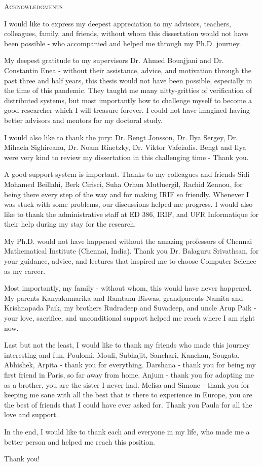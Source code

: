 \begin{center}
    \textsc{Acknowledgments}
  \end{center}
  \noindent

I would like to express my deepest appreciation to my advisors, teachers, colleagues, family, and friends, without whom this dissertation would not have been possible - who accompanied and helped me through my Ph.D. journey.

My deepest gratitude to my supervisors Dr. Ahmed Bouajjani and Dr. Constantin Enea - without their assistance, advice, and motivation through the past three and half years, this thesis would not have been possible, especially in the time of this pandemic. They taught me many nitty-gritties of verification of distributed systems, but most importantly how to challenge myself to become a good researcher which I will treasure forever. I could not have imagined having better advisors and mentors for my doctoral study.

I would also like to thank the jury: Dr. Bengt Jonsson, Dr. Ilya Sergey, Dr. Mihaela Sighireanu, Dr. Noam Rinetzky, Dr. Viktor Vafeiadis. Bengt and Ilya were very kind to review my dissertation in this challenging time - Thank you.

A good support system is important. Thanks to my colleagues and friends Sidi Mohamed Beillahi, Berk Cirisci, Suha Orhun Mutluergil, Rachid Zennou, for being there every step of the way and for making IRIF so friendly. Whenever I was stuck with some problems, our discussions helped me progress. I would also like to thank the administrative staff at ED 386, IRIF, and UFR Informatique for their help during my stay for the research.

My Ph.D. would not have happened without the amazing professors of Chennai Mathematical Institute (Chennai, India). Thank you Dr. Balaguru Srivathsan, for your guidance, advice, and lectures that inspired me to choose Computer Science as my career. 

Most importantly, my family - without whom, this would have never happened. My parents Kanyakumarika and Ramtanu Biswas, grandparents Namita and Krishnapada Paik, my brothers Rudradeep and Suvadeep, and uncle Arup Paik - your love, sacrifice, and unconditional support helped me reach where I am right now.

Last but not the least, I would like to thank my friends who made this journey interesting and fun. Poulomi, Mouli, Subhajit, Sanchari, Kanchan, Sougata, Abhishek, Arpita - thank you for everything. Darshana - thank you for being my first friend in Paris, so far away from home.  Anjum - thank you for adopting me as a brother, you are the sister I never had. Melisa and Simone - thank you for keeping me sane with all the best that is there to experience in Europe, you are the best of friends that I could have ever asked for. Thank you Paula for all the love and support.

In the end, I would like to thank each and everyone in my life, who made me a better person and helped me reach this position. 

Thank you!